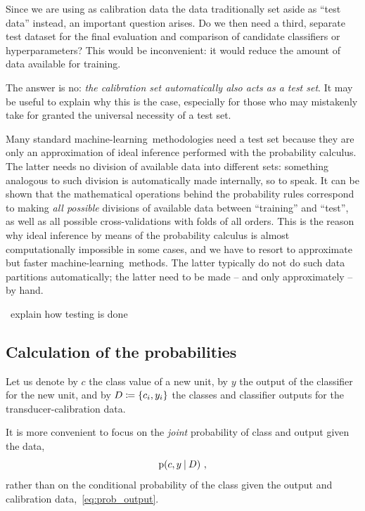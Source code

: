 \documentclass[\ifafour a4paper,12pt,\else a5paper,10pt,\fi%
onecolumn,oneside,article,%
british%
]{memoir}
\theoremstyle{remark}
\theoremstyle{innote}
\newcommand*{\pencil}{{\fontencoding{U}\fontfamily{fontawesometwo}\selectfont\symbol{210}}}
\newcommand{\mynotep}[1]{{\footnotesize\color{notecolour}\pencil\ #1}}
\newcommand*{\defd}{\coloneqq}
\DeclarePairedDelimiter\set{\{}{\}} %
\newcommand*{\p}{\mathrm{p}}%
\renewcommand*{\|}[1][]{\nonscript\:#1\vert\nonscript\:\mathopen{}}
\newcommand*{\ml}{machine-learning}
\begin{document}
\medskip

Since we are using as calibration data the data traditionally set aside as \enquote{test data} instead, an important question arises. Do we then need a third, separate test dataset for the final evaluation and comparison of candidate classifiers or hyperparameters? This would be inconvenient: it would reduce the amount of data available for training.

The answer is no: \emph{the calibration set automatically also acts as a test set}. It may be useful to explain why this is the case, especially for those who may mistakenly take for granted the universal necessity of a test set.

Many standard \ml\ methodologies need a test set because they are only an approximation of ideal inference performed with the probability calculus. The latter needs no division of available data into different sets: something analogous to such division is automatically made internally, so to speak. It can be shown \autocites{portamana2019b,fongetal2020,wald1949}[many examples of this fact are scattered across the text by][]{jaynes1994_r2003} that the mathematical operations behind the probability rules correspond to making \emph{all possible} divisions of available data between \enquote{training} and \enquote{test}, as well as all possible cross-validations with folds of all orders. This is the reason why ideal inference by means of the probability calculus is almost computationally impossible in some cases, and we have to resort to approximate but faster \ml\ methods. The latter typically do not do such data partitions automatically; the latter need to be made -- and only approximately -- by hand.


\mynotep{explain how testing is done}


\subsection{Calculation of the probabilities}
\label{sec:calculation_transducer}

Let us denote by $c$ the class value of a new unit, by $y$ the output of the classifier for the new unit, and by $D \defd \set{c_{i}, y_{i}}$ the classes and classifier outputs for the transducer-calibration data.

It is more convenient to focus on the \emph{joint} probability of class and output given the data,
\begin{equation}
  \label{eq:prob_output}
  \p(c, y \| D) \ ,
\end{equation}
rather than on the conditional probability of the class given the output and calibration data,~\eqref{eq:prob_output}.
\end{document}
